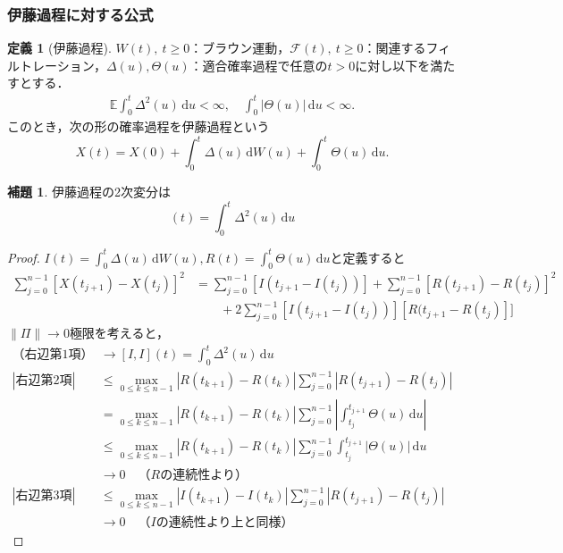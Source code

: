 \documentclass[a4paper, lualatex, ja=standard]{bxjsarticle}
\theoremstyle{definition}
\newtheorem{dfn}[thm]{定義}
\newtheorem{lem}[thm]{補題}
\newcommand{\F}{\mathcal{F}}
\newcommand{\E}{\mathbb{E}}
\newcommand{\diff}{\mathrm{d}}
\begin{document}
\subsubsection{伊藤過程に対する公式}
\begin{dfn}[伊藤過程]
  $W(t),\ t\geq0$：ブラウン運動，$\F(t),\ t\geq0$：関連するフィルトレーション，$\Delta(u),\Theta(u)$：適合確率過程で任意の$t>0$に対し以下を満たすとする．
  \begin{align*}
    \E\int_0^t \Delta^2(u)\,\diff u< \infty,\quad \int_0^t |\Theta(u)|\,\diff u<\infty.
  \end{align*}
  このとき，次の形の確率過程を伊藤過程という
  \begin{equation}
    X(t) = X(0) + \int_0^t \Delta(u)\,\diff W(u) + \int_0^t \Theta(u)\,\diff u.
  \end{equation}
\end{dfn}
\begin{lem}
  伊藤過程の2次変分は
  \begin{equation}
    [X,X](t) = \int_0^t \Delta^2(u)\,\diff u
  \end{equation}
\end{lem}
\begin{proof}
  $I(t)=\int_0^t\Delta(u)\,\diff W(u), R(t)=\int_0^t\Theta(u)\,\diff u$と定義すると
  \begin{align*}
    \sum_{j=0}^{n-1}[X(t_{j+1})-X(t_j)]^2 &= \sum_{j=0}^{n-1} [I(t_{j+1}-I(t_j))] + \sum_{j=0}^{n-1} [R(t_{j+1})-R(t_j)]^2 \\
    &\qquad + 2\sum_{j=0}^{n-1} [I(t_{j+1}-I(t_j))][R(t_{j+1}-R(t_j)]]
  \end{align*}
  $\|\Pi\|\to0$極限を考えると，
  \begin{align*}
    \text{（右辺第1項）} &\to [I,I](t) = \int_0^t\Delta^2(u)\,\diff u\\
    |\text{右辺第2項}| &\leq \max_{0\leq k\leq n-1}|R(t_{k+1})-R(t_k)|\sum_{j=0}^{n-1}|R(t_{j+1})-R(t_j)| \\
    &= \max_{0\leq k\leq n-1}|R(t_{k+1})-R(t_k)|\sum_{j=0}^{n-1}\left|\int_{t_j}^{t_{j+1}}\Theta(u)\,\diff u\right| \\
    &\leq \max_{0\leq k\leq n-1}|R(t_{k+1})-R(t_k)|\sum_{j=0}^{n-1}\int_{t_j}^{t_{j+1}}|\Theta(u)|\,\diff u \\
    &\to 0\quad\text{（$R$の連続性より）}\\
    |\text{右辺第3項}| &\leq \max_{0\leq k\leq n-1}|I(t_{k+1})-I(t_k)|\sum_{j=0}^{n-1}|R(t_{j+1})-R(t_j)| \\
    &\to 0\quad\text{（$I$の連続性より上と同様）}
  \end{align*}
\end{proof}
\end{document}
